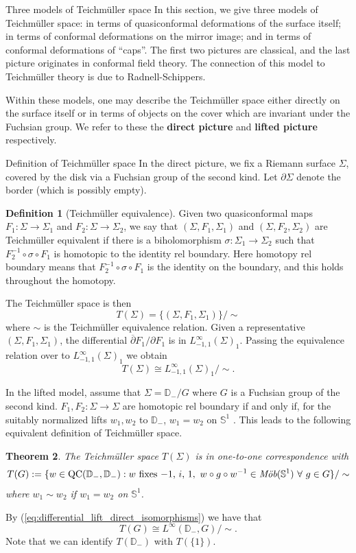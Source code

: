 \documentclass[12pt]{amsart}
\newcommand{\disk}{\ensuremath{\mathbb{D}} } %
\newcommand{\riem}{\Sigma}  %
\theoremstyle{plain}
\newtheorem{theorem}{Theorem}[section]
\theoremstyle{definition}
\newtheorem{definition}[theorem]{Definition}
\theoremstyle{remark}
\numberwithin{equation}{section} %
\numberwithin{figure}{section} %
\begin{document}
\begin{section}{Three models of Teichm\"uller space}\label{se:three_models}  
 In this section, we give three models of Teichm\"uller space: in terms of quasiconformal deformations of the surface itself; in terms of conformal deformations on the mirror image; and in terms of conformal deformations of ``caps''. The first two pictures are classical, and the last picture originates in conformal field theory. The connection of this model to Teichm\"uller theory is due to Radnell-Schippers. 

 Within these models, one may describe the Teichm\"uller space either directly on the surface itself or in terms of objects on the cover which are invariant under the Fuchsian group. We refer to these the {\bf direct picture} and {\bf lifted picture} respectively.

 \begin{subsection}{Definition of Teichm\"uller space} 
   In the direct picture, we fix a Riemann surface $\riem$, covered by the disk via a Fuchsian group of the second kind. Let $\partial \riem$ denote the border (which is possibly empty). 
   \begin{definition}[Teichm\"uller equivalence]
   Given two quasiconformal maps $F_1 :\riem \rightarrow \riem_1$ and $F_2: \riem \rightarrow \riem_2$, we say that $(\riem,F_1,\riem_1)$ and $(\riem,F_2,\riem_2)$ are Teichm\"uller equivalent if there is a biholomorphism $\sigma:\riem_1 \rightarrow \riem_2$ such that $F_2^{-1} \circ \sigma \circ F_1$ is homotopic to the identity rel boundary. Here homotopy rel boundary means that $F_2^{-1} \circ \sigma \circ F_1$ is the identity on the boundary, and this holds throughout the homotopy.
   \end{definition}

   The Teichm\"uller space is then 
   \[ T(\riem) = \{ (\riem,F_1,\riem_1) \}/\sim  \]
   where $\sim$ is the Teichm\"uller equivalence relation.  
   Given a representative $(\riem,F_1,\riem_1)$, the differential $\overline{\partial} F_1/\partial F_1$ is in $L^\infty_{-1,1}(\riem)_1$.  Passing the equivalence relation over to $L^\infty_{-1,1}(\riem)_1$ we obtain 
   \[   T(\riem) \cong L^\infty_{-1,1}(\riem)_1 /\sim. \]

   In the lifted model, assume that $\riem = \disk_- /G$ where $G$ is a Fuchsian group of the second kind. 
   $F_1,F_2 :\riem \rightarrow \riem$ are homotopic rel boundary if and only if, for the suitably normalized lifts $w_1, w_2$ to $\disk_-$, $w_1 = w_2$ on $\mathbb{S}^1$   
 \cite{Lehto}. This leads to the following equivalent definition of Teichm\"uller space.
 \begin{theorem} \label{th:Fuchsian_qcmap_model} The Teichm\"uller space $T(\riem)$ is in one-to-one correspondence with 
    \[ T(G):= \{ w\in \mathrm{QC}(\disk_- ,\disk_-) : w \ \text{fixes $-1$, $i$, $1$}, \  w \circ g \circ w^{-1} \in \emph{M\"ob}(\mathbb{S}^1) \ \forall \ g \in G \}/\sim \]
    where $w_1 \sim w_2$ if $w_1 = w_2$ on $\mathbb{S}^1$.
 \end{theorem}
 By (\ref{eq:differential_lift_direct_isomorphisms}) we have that 
 \[ T(G) \cong L^\infty(\disk_-,G)/\sim. \]
 Note that we can identify $T(\disk_-)$ with $T(\{ 1 \})$. 
 

\end{subsection}
\end{section}
\end{document}
